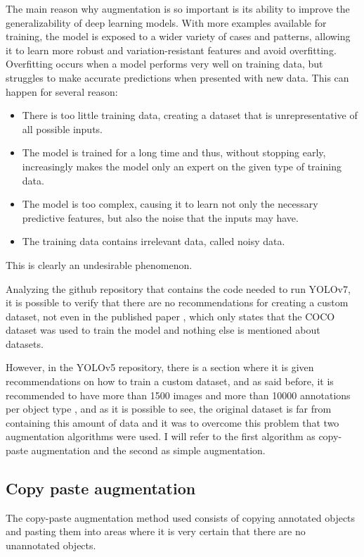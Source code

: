 The main reason why augmentation is so important is its ability to improve the generalizability of deep learning models. With more examples available for training, the model is exposed to a wider variety of cases and patterns, allowing it to learn more robust and variation-resistant features and avoid overfitting.
Overfitting occurs when a model performs very well on training data, but struggles to make accurate predictions when presented with new data. This can happen for several reason\cite{overfitting}:

\begin{itemize}
\item There is too little training data, creating a dataset that is unrepresentative of all possible inputs.

\item The model is trained for a long time and thus, without stopping early, increasingly makes the model only an expert on the given type of training data.

\item The model is too complex, causing it to learn not only the necessary predictive features, but also the noise that the inputs may have.

\item The training data contains irrelevant data, called noisy data.
\end{itemize}

This is clearly an undesirable phenomenon.

Analyzing the github repository that contains the code needed to run YOLOv7, it is possible to verify that there are no recommendations for creating a custom dataset, not even in the published paper \cite{paperyolov7}, which only states that the COCO dataset was used to train the model and nothing else is mentioned about datasets. 

However, in the YOLOv5 repository, there is a section where it is given recommendations on how to train a custom dataset, and as said before, it is recommended to have more than 1500 images and more than 10000 annotations per object type \cite{yolov5recomedacoes}, and as it is possible to see, the original dataset is far from containing this amount of data and it was to overcome this problem that two augmentation algorithms were used.
I will refer to the first algorithm as copy-paste augmentation and the second as simple augmentation.

\subsection{Copy paste augmentation}
The copy-paste augmentation method used consists of copying annotated objects and pasting them into areas where it is very certain that there are no unannotated objects.

